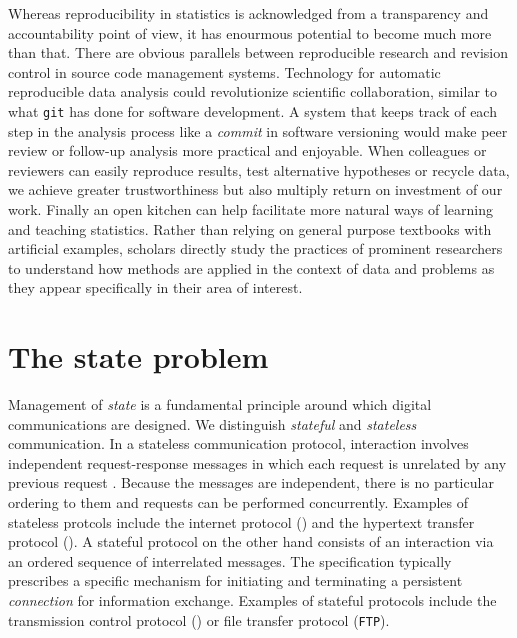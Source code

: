 Whereas reproducibility in statistics is acknowledged from a transparency and accountability point of view, it has enourmous potential to become much more than that. There are obvious parallels between reproducible research and revision control in source code management systems. Technology for automatic reproducible data analysis could revolutionize scientific collaboration, similar to what \texttt{git} has done for software development. A system that keeps track of each step in the  analysis process like a \emph{commit} in software versioning would make peer review or follow-up analysis more practical and enjoyable. 
When colleagues or reviewers can easily reproduce results, test alternative hypotheses or recycle data, we achieve greater trustworthiness but also multiply return on investment of our work. Finally an open kitchen can help facilitate more natural ways of learning and teaching statistics. Rather than relying on general purpose textbooks with artificial examples, scholars directly study the practices of prominent researchers to understand how methods are applied in the context of data and problems as they appear specifically in their area of interest.


\section{The state problem}

Management of \emph{state} is a fundamental principle around which digital communications are designed. We distinguish \emph{stateful} and \emph{stateless} communication. In a stateless communication protocol, interaction involves independent request-response messages in which each request is unrelated by any previous request \citep{hennessy2012computer}. Because the messages are independent, there is no particular ordering to them and requests can be performed concurrently. Examples of stateless protcols include the internet protocol (\IP) and the hypertext transfer protocol (\HTTP). A stateful protocol on the other hand consists of an interaction via an ordered sequence of interrelated messages. The specification typically prescribes a specific mechanism for initiating and terminating a persistent \emph{connection} for information exchange. Examples of stateful protocols include the transmission control protocol (\TCP) or file transfer protocol (\texttt{FTP}).

